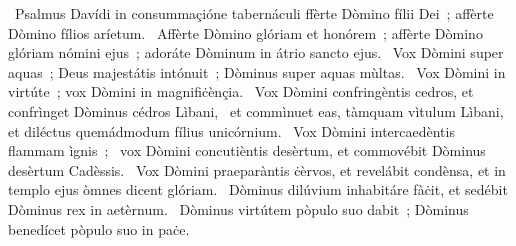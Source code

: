 {~Psalmus Davídi in consummaçióne tabernáculi}
{%
ffèrte Dòmino fílii Dei~; affèrte Dòmino fílios aríetum.
~Affèrte Dòmino glóriam et honórem~; affèrte Dòmino glóriam nómini ejus~; adoráte Dòminum in átrio sancto ejus.
~Vox Dòmini super aquas~; Deus majestátis intónuit~; Dòminus super aquas mùltas.
~Vox Dòmini in virtúte~; vox Dòmini in magnifiċènçia.
~Vox Dòmini confringèntis cedros, et confrìnget Dòminus cédros Lìbani,
~et commìnuet eas, tàmquam vìtulum Lìbani, et diléctus quemádmodum fílius unicórnium.
~Vox Dòmini intercaedèntis flammam ìgnis~;
~vox Dòmini concutièntis desèrtum, et commovébit Dòminus desèrtum Cadèssis.
~Vox Dòmini praeparàntis ċèrvos, et revelábit condènsa, et in templo ejus òmnes dicent glóriam.
~Dòminus dilúvium inhabitáre fàċit, et sedébit Dòminus rex in aetèrnum.
~Dòminus virtútem pòpulo suo dabit~; Dòminus benedícet pòpulo suo in paċe.}
